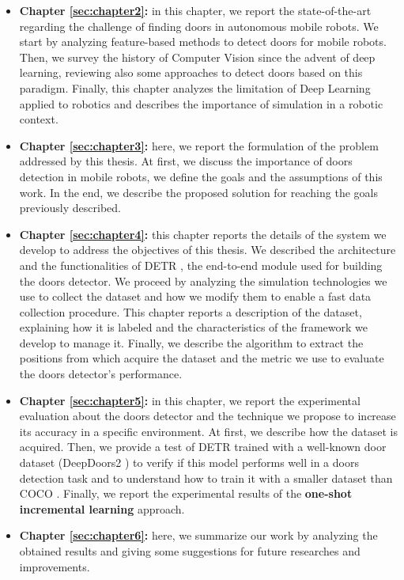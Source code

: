 \begin{itemize}
	\item \textbf{Chapter \ref{sec:chapter2}:} in this chapter, we report the state-of-the-art regarding the challenge of finding doors in autonomous mobile robots. We start by analyzing feature-based methods to detect doors for mobile robots. Then, we survey the history of Computer Vision since the advent of deep learning, reviewing also some approaches to detect doors based on this paradigm. Finally, this chapter analyzes the limitation of Deep Learning applied to robotics and describes the importance of simulation in a robotic context.
	
	\item \textbf{Chapter \ref{sec:chapter3}:} here, we report the formulation of the problem addressed by this thesis. At first, we discuss the importance of doors detection in mobile robots, we define the goals and the assumptions of this work. In the end, we describe the proposed solution for reaching the goals previously described.
	
	\item \textbf{Chapter \ref{sec:chapter4}:} this chapter reports the details of the system we develop to address the objectives of this thesis. We described the architecture and the functionalities of DETR \cite{detr}, the end-to-end module used for building the doors detector. We proceed by analyzing the simulation technologies we use to collect the dataset and how we modify them to enable a fast data collection procedure. This chapter reports a description of the dataset, explaining how it is labeled and the characteristics of the framework we develop to manage it. Finally, we describe the algorithm to extract the positions from which acquire the dataset and the metric we use to evaluate the doors detector's performance.
	
	\item \textbf{Chapter \ref{sec:chapter5}:} in this chapter, we report the experimental evaluation about the doors detector and the technique we propose to increase its accuracy in a specific environment. At first, we describe how  the dataset is acquired. Then, we provide a test of DETR trained with a well-known door dataset (DeepDoors2 \cite{deepdoors2}) to verify if this model performs well in a doors detection task and to understand how to train it with a smaller dataset than COCO \cite{coco}. Finally, we report the experimental results of the \textbf{one-shot incremental learning} approach.
	
	\item \textbf{Chapter \ref{sec:chapter6}:} here, we summarize our work by analyzing the obtained results and giving some suggestions for future researches and improvements.
\end{itemize}
